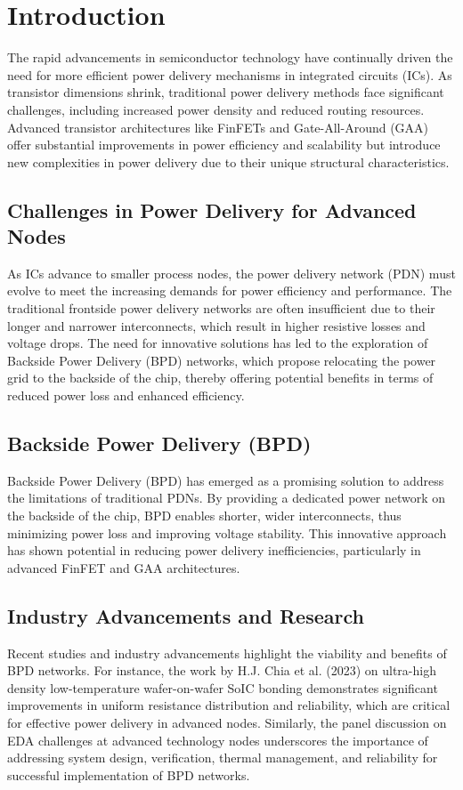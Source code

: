 \section{Introduction}
The rapid advancements in semiconductor technology have continually driven the need for more efficient power delivery mechanisms in integrated circuits (ICs). As transistor dimensions shrink, traditional power delivery methods face significant challenges, including increased power density and reduced routing resources. Advanced transistor architectures like FinFETs and Gate-All-Around (GAA) offer substantial improvements in power efficiency and scalability but introduce new complexities in power delivery due to their unique structural characteristics.

\subsection{Challenges in Power Delivery for Advanced Nodes}
As ICs advance to smaller process nodes, the power delivery network (PDN) must evolve to meet the increasing demands for power efficiency and performance. The traditional frontside power delivery networks are often insufficient due to their longer and narrower interconnects, which result in higher resistive losses and voltage drops. The need for innovative solutions has led to the exploration of Backside Power Delivery (BPD) networks, which propose relocating the power grid to the backside of the chip, thereby offering potential benefits in terms of reduced power loss and enhanced efficiency.

\subsection{Backside Power Delivery (BPD)}
Backside Power Delivery (BPD) has emerged as a promising solution to address the limitations of traditional PDNs. By providing a dedicated power network on the backside of the chip, BPD enables shorter, wider interconnects, thus minimizing power loss and improving voltage stability. This innovative approach has shown potential in reducing power delivery inefficiencies, particularly in advanced FinFET and GAA architectures.

\subsection{Industry Advancements and Research}
Recent studies and industry advancements highlight the viability and benefits of BPD networks. For instance, the work by H.J. Chia et al. (2023) on ultra-high density low-temperature wafer-on-wafer SoIC bonding demonstrates significant improvements in uniform resistance distribution and reliability, which are critical for effective power delivery in advanced nodes. Similarly, the panel discussion on EDA challenges at advanced technology nodes underscores the importance of addressing system design, verification, thermal management, and reliability for successful implementation of BPD networks.

